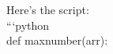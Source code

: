 \documentclass[preview]{standalone}
\begin{document}
Here's the script:\\```python\\def maxnumber(arr):\\
\end{document}
